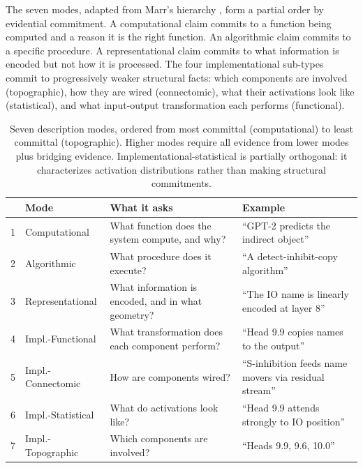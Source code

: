 \documentclass[10pt]{article}
\begin{document}
The seven modes, adapted from Marr's hierarchy \citep{marr1982vision}, form a partial order by evidential commitment. A computational claim commits to a function being computed and a reason it is the right function. An algorithmic claim commits to a specific procedure. A representational claim commits to what information is encoded but not how it is processed. The four implementational sub-types commit to progressively weaker structural facts: which components are involved (topographic), how they are wired (connectomic), what their activations look like (statistical), and what input-output transformation each performs (functional).

\begin{table}[H]
\centering
\small
\caption{Seven description modes, ordered from most committal (computational) to least committal (topographic). Higher modes require all evidence from lower modes plus bridging evidence. Implementational-statistical is partially orthogonal: it characterizes activation distributions rather than making structural commitments.}
\label{tab:modes}
\renewcommand{\arraystretch}{1.2}
\begin{tabular}{@{}rl>{\raggedright\arraybackslash}p{4.8cm}>{\raggedright\arraybackslash}p{5.2cm}@{}}
\toprule
& \textbf{Mode} & \textbf{What it asks} & \textbf{Example} \\
\midrule
1 & Computational & What function does the system compute, and why? & ``GPT-2 predicts the indirect object'' \\
\midrule
2 & Algorithmic & What procedure does it execute? & ``A detect-inhibit-copy algorithm'' \\
\midrule
3 & Representational & What information is encoded, and in what geometry? & ``The IO name is linearly encoded at layer 8'' \\
\midrule
4 & Impl.-Functional & What transformation does each component perform? & ``Head 9.9 copies names to the output'' \\
\midrule
5 & Impl.-Connectomic & How are components wired? & ``S-inhibition feeds name movers via residual stream'' \\
\midrule
6 & Impl.-Statistical & What do activations look like? & ``Head 9.9 attends strongly to IO position'' \\
\midrule
7 & Impl.-Topographic & Which components are involved? & ``Heads 9.9, 9.6, 10.0'' \\
\bottomrule
\end{tabular}
\end{table}
\end{document}
